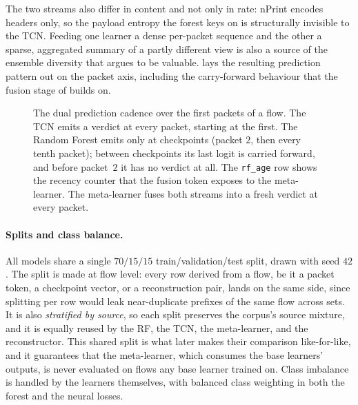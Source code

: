 The two streams also differ in content and not only in rate: nPrint encodes headers
only, so the payload entropy the forest keys on is structurally invisible to the
\ac{TCN}. Feeding one learner a dense per-packet sequence and the other a sparse,
aggregated summary of a partly different view is also a source of the ensemble diversity
that  argues to be valuable.  lays the
resulting prediction pattern out on the packet axis, including the carry-forward
behaviour that the fusion stage of  builds on.

\begin{figure}[htbp]
    \centering
    
    \caption[The dual prediction cadence over a flow.]{The dual prediction cadence over
    the first packets of a flow. The TCN emits a verdict at every packet,
    starting at the first. The Random Forest emits only at checkpoints
    (packet $2$, then every tenth packet); between checkpoints its last logit
    is carried forward, and before packet~$2$ it has no verdict at all. The
    \texttt{rf\_age} row shows the recency counter that the fusion token exposes to the
    meta-learner. The meta-learner fuses both streams into a fresh verdict
    at every packet.}
    \label{fig:sol-cadence}
\end{figure}

\paragraph{Splits and class balance.}
All models share a single $70/15/15$ train/validation/test split, drawn with seed $42$.
The split is made at flow level: every row derived from a flow, be it a packet token, a
checkpoint vector, or a reconstruction pair, lands on the same side, since splitting
per row would leak near-duplicate prefixes of the same flow across sets. It is also
\emph{stratified by source}, so each split preserves the corpus's source mixture, and
it is equally reused by the \ac{RF}, the \ac{TCN}, the meta-learner, and the
reconstructor. This shared split is what later makes their comparison
like-for-like, and it guarantees that the meta-learner, which consumes
the base learners' outputs, is never evaluated on flows any base learner trained on.
Class imbalance is handled by the learners themselves, with balanced class weighting
in both the forest and the neural losses.

